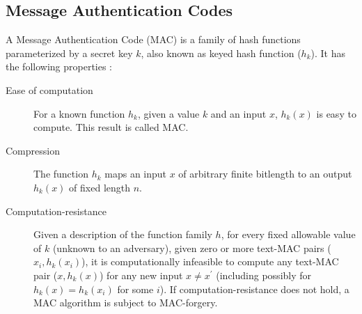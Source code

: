 \documentclass[%
  slidesonly,%
  semlayer%
  ]{seminar}                                  %
\begin{document}
\begin{slide}
  \subsection*{Message Authentication Codes}
    A Message Authentication Code (MAC) is a family of hash functions parameterized by a secret key $k$, also known as keyed hash function ($h_{k}$).
    It has the following properties :
    \begin{description}
      \item [Ease of computation] For a known function $h_{k}$, given a value $k$
      and an input $x$, $h_{k}(x)$ is easy to compute.
      This result is called MAC.
      \item [Compression] The function $h_{k}$ maps an input $x$ of arbitrary finite bitlength to an output $h_{k}(x)$ of fixed length $n$.  
      \item [Computation-resistance] Given a description of the function family $h$, for every fixed allowable value of $k$ (unknown to an adversary), given zero or more text-MAC pairs ($x_{i}, h_{k}(x_{i})$), it is computationally infeasible to compute any text-MAC pair ($x,h_{k}(x)$) for any new input $x \neq x^{'}$ (including possibly for $h_{k}(x) = h_{k}(x_{i})$ for some $i$). 
    If computation-resistance does not hold, a MAC algorithm is subject to MAC-forgery.
    \end{description}
    \clearpage


\end{slide}
\end{document}
